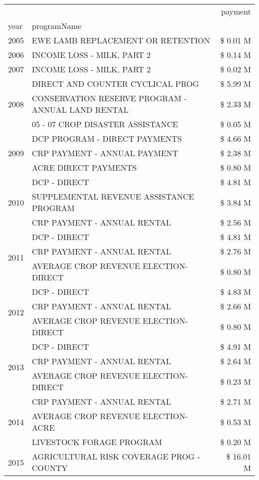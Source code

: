 \begin{tabular}{llr}
\toprule
 &  & payment \\
year & programName &  \\
\midrule
2005 & EWE LAMB REPLACEMENT OR RETENTION & \$ 0.01 M \\
\cline{1-3}
2006 & INCOME LOSS - MILK, PART 2 & \$ 0.14 M \\
\cline{1-3}
2007 & INCOME LOSS - MILK, PART 2 & \$ 0.02 M \\
\cline{1-3}
\multirow[t]{3}{*}{2008} & DIRECT AND COUNTER CYCLICAL PROG & \$ 5.99 M \\
 & CONSERVATION RESERVE PROGRAM - ANNUAL LAND RENTAL & \$ 2.33 M \\
 & 05 - 07 CROP DISASTER ASSISTANCE & \$ 0.05 M \\
\cline{1-3}
\multirow[t]{3}{*}{2009} & DCP PROGRAM - DIRECT PAYMENTS & \$ 4.66 M \\
 & CRP PAYMENT - ANNUAL PAYMENT & \$ 2.38 M \\
 & ACRE DIRECT PAYMENTS & \$ 0.80 M \\
\cline{1-3}
\multirow[t]{3}{*}{2010} & DCP - DIRECT & \$ 4.81 M \\
 & SUPPLEMENTAL REVENUE ASSISTANCE PROGRAM & \$ 3.84 M \\
 & CRP PAYMENT - ANNUAL RENTAL & \$ 2.56 M \\
\cline{1-3}
\multirow[t]{3}{*}{2011} & DCP - DIRECT & \$ 4.81 M \\
 & CRP PAYMENT - ANNUAL RENTAL & \$ 2.76 M \\
 & AVERAGE CROP REVENUE ELECTION-DIRECT & \$ 0.80 M \\
\cline{1-3}
\multirow[t]{3}{*}{2012} & DCP - DIRECT & \$ 4.83 M \\
 & CRP PAYMENT - ANNUAL RENTAL & \$ 2.66 M \\
 & AVERAGE CROP REVENUE ELECTION-DIRECT & \$ 0.80 M \\
\cline{1-3}
\multirow[t]{3}{*}{2013} & DCP - DIRECT & \$ 4.91 M \\
 & CRP PAYMENT - ANNUAL RENTAL & \$ 2.64 M \\
 & AVERAGE CROP REVENUE ELECTION-DIRECT & \$ 0.23 M \\
\cline{1-3}
\multirow[t]{3}{*}{2014} & CRP PAYMENT - ANNUAL RENTAL & \$ 2.71 M \\
 & AVERAGE CROP REVENUE ELECTION-ACRE & \$ 0.53 M \\
 & LIVESTOCK FORAGE PROGRAM & \$ 0.20 M \\
\cline{1-3}
\multirow[t]{3}{*}{2015} & AGRICULTURAL RISK COVERAGE PROG - COUNTY & \$ 16.01 M \\

\end{tabular}
